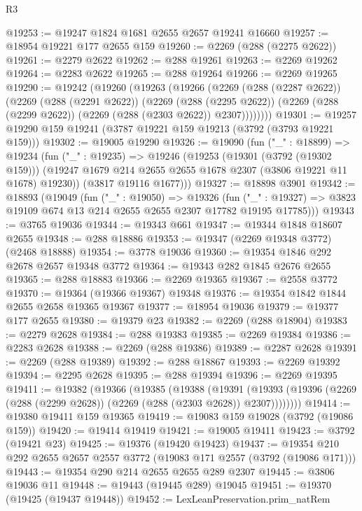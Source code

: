 \begin{lexlean}{R3}
\begin{coremodule}
@19253 := @19247 @1824 @1681 @2655 @2657 @19241 @16660
@19257 := @18954 @19221 @177 @2655 @159
@19260 := @2269 (@288 (@2275 @2622))
@19261 := @2279 @2622
@19262 := @288 @19261
@19263 := @2269 @19262
@19264 := @2283 @2622
@19265 := @288 @19264
@19266 := @2269 @19265
@19290 := @19242
    (@19260
      (@19263
        (@19266
          (@2269
            (@288 (@2287 @2622))
            (@2269
              (@288 (@2291 @2622))
              (@2269
                (@288 (@2295 @2622))
                (@2269 (@288 (@2299 @2622)) (@2269 (@288 (@2303 @2622)) @2307))))))))
@19301 := @19257 @19290 @159 @19241 (@3787 @19221 @159 @19213 (@3792 (@3793 @19221 @159)))
@19302 := @19005 @19290
@19326 := @19090
    (fun ("_" : @18899) =>
    @19234
      (fun ("_" : @19235) =>
      @19246
        (@19253
          (@19301 (@3792 (@19302 @159)))
          (@19247 @1679 @214 @2655 @2655 @1678 @2307 (@3806 @19221 @11 @1678) @19230))
        (@3817 @19116 @1677)))
@19327 := @18898 @3901
@19342 := @18893
    (@19049
      (fun ("_" : @19050) =>
      @19326
        (fun ("_" : @19327) => @3823 @19109 @674 @13 @214 @2655 @2655 @2307 @17782 @19195 @17785)))
@19343 := @3765 @19036
@19344 := @19343 @661
@19347 := @19344 @1848 @18607 @2655
@19348 := @288 @18886
@19353 := @19347 (@2269 @19348 @3772) (@2468 @18888)
@19354 := @3778 @19036
@19360 := @19354 @1846 @292 @2678 @2657 @19348 @3772
@19364 := @19343 @282 @1845 @2676 @2655
@19365 := @288 @18883
@19366 := @2269 @19365
@19367 := @2558 @3772
@19370 := @19364 (@19366 @19367) @19348
@19376 := @19354 @1842 @1844 @2655 @2658 @19365 @19367
@19377 := @18954 @19036
@19379 := @19377 @177 @2655
@19380 := @19379 @23
@19382 := @2269 (@288 @18904)
@19383 := @2279 @2628
@19384 := @288 @19383
@19385 := @2269 @19384
@19386 := @2283 @2628
@19388 := @2269 (@288 @19386)
@19389 := @2287 @2628
@19391 := @2269 (@288 @19389)
@19392 := @288 @18867
@19393 := @2269 @19392
@19394 := @2295 @2628
@19395 := @288 @19394
@19396 := @2269 @19395
@19411 := @19382
    (@19366
      (@19385
        (@19388
          (@19391
            (@19393 (@19396 (@2269 (@288 (@2299 @2628)) (@2269 (@288 (@2303 @2628)) @2307))))))))
@19414 := @19380 @19411 @159 @19365
@19419 := @19083 @159 @19028 (@3792 (@19086 @159))
@19420 := @19414 @19419
@19421 := @19005 @19411
@19423 := @3792 (@19421 @23)
@19425 := @19376 (@19420 @19423)
@19437 := @19354 @210 @292 @2655 @2657 @2557 @3772 (@19083 @171 @2557 (@3792 (@19086 @171)))
@19443 := @19354 @290 @214 @2655 @2655 @289 @2307
@19445 := @3806 @19036 @11
@19448 := @19443 (@19445 @289) @19045
@19451 := @19370 (@19425 (@19437 @19448))
@19452 := LexLeanPreservation.prim_natRem

\end{coremodule}
\end{lexlean}
